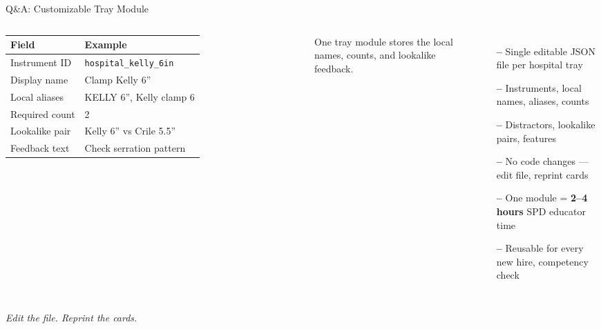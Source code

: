 \documentclass[10pt,aspectratio=169]{beamer}
\newcommand{\takeaway}[1]{%
  \vspace{0.25cm}
  \begin{center}\textit{\small #1}\end{center}
}
\begin{document}
\begin{frame}{Q\&A: Customizable Tray Module}
  \begin{columns}[T]
    \footnotesize
    \begin{tabularx}{\columnwidth}{l X}
      \toprule
      Field & Example \\
      \midrule
      Instrument ID & \texttt{hospital\_kelly\_6in} \\
      Display name & Clamp Kelly 6'' \\
      Local aliases & KELLY 6'', Kelly clamp 6 \\
      Required count & 2 \\
      Lookalike pair & Kelly 6'' vs Crile 5.5'' \\
      Feedback text & Check serration pattern \\
      \bottomrule
    \end{tabularx}
    \vspace{0.35cm}
    \begin{block}{}
      \centering
      \small One tray module stores the local names, counts, and lookalike feedback.
    \end{block}
    \begin{itemize}
      \item[\textbf{--}] Single editable JSON file per hospital tray

      \item[\textbf{--}] Instruments, local names, aliases, counts

      \item[\textbf{--}] Distractors, lookalike pairs, features

      \item[\textbf{--}] No code changes --- edit file, reprint cards

      \item[\textbf{--}] One module = \textbf{2--4 hours} SPD educator time

      \item[\textbf{--}] Reusable for every new hire, competency check
    \end{itemize}
  \end{columns}
  \vspace{0.15cm}
  \takeaway{Edit the file. Reprint the cards.}
\end{frame}
\end{document}
